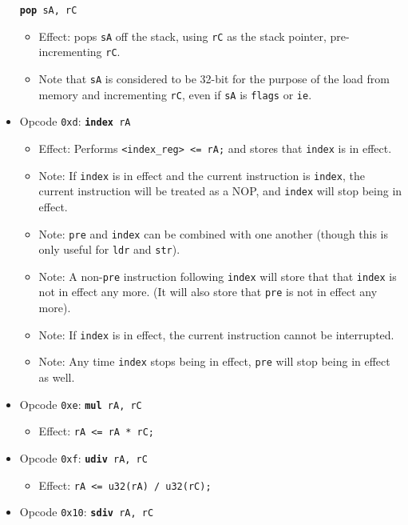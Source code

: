 \documentclass{article}
\begin{document}
\begin{itemize}
			\texttt{\textbf{pop} sA, rC}
		\begin{itemize}
			\item Effect: pops \texttt{sA} off the stack, using
			\texttt{rC} as the stack pointer, pre-incrementing \texttt{rC}.
			\item Note that \texttt{sA} is considered to be 32-bit for the
			purpose of the load from memory and incrementing \texttt{rC},
			even if \texttt{sA} is \texttt{flags} or \texttt{ie}.
		\end{itemize}
		\item Opcode \texttt{0xd}:
			\texttt{\textbf{index} rA}
		\begin{itemize}
			\item Effect: Performs \texttt{<index\_reg> <= rA;} and stores
			that \texttt{index} is in effect.
			\item Note: If \texttt{index} is in effect and the current
			instruction is \texttt{index}, the current instruction will be
			treated as a NOP, and \texttt{index} will stop being in effect.
			\item Note: \texttt{pre} and \texttt{index} can be combined
			with one another (though this is only useful for \texttt{ldr}
			and \texttt{str}).
			\item Note: A non-\texttt{pre} instruction following
			\texttt{index} will store that that \texttt{index} is not in
			effect any more. (It will also store that \texttt{pre} is not
			in effect any more).
			\item Note: If \texttt{index} is in effect, the current
			instruction cannot be interrupted.
			\item Note: Any time \texttt{index} stops being in effect,
			\texttt{pre} will stop being in effect as well.
		\end{itemize}
		\item Opcode \texttt{0xe}:
			\texttt{\textbf{mul} rA, rC}
		\begin{itemize}
			\item Effect: \texttt{rA <= rA * rC;}
		\end{itemize}
		\item Opcode \texttt{0xf}:
			\texttt{\textbf{udiv} rA, rC}
		\begin{itemize}
			\item Effect: \texttt{rA <= u32(rA) / u32(rC);}
		\end{itemize}
		\item Opcode \texttt{0x10}:
			\texttt{\textbf{sdiv} rA, rC}
		\begin{itemize}

\end{itemize}
\end{itemize}
\end{document}
